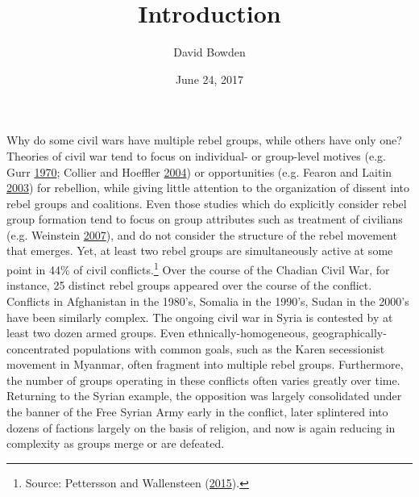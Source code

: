 \documentclass[12pt,]{book}
\title{Introduction}
\author{David Bowden}
\date{June 24, 2017}
\let\rmarkdownfootnote\footnote%
\def\footnote{\protect\rmarkdownfootnote}
\theoremstyle{definition}
\theoremstyle{definition}
\theoremstyle{remark}
\begin{document}
\maketitle

\doublespacing

\mainmatter

Why do some civil wars have multiple rebel groups, while others have
only one? Theories of civil war tend to focus on individual- or
group-level motives (e.g. Gurr \protect\hyperlink{ref-gurr70}{1970};
Collier and Hoeffler \protect\hyperlink{ref-Collier2004}{2004}) or
opportunities (e.g. Fearon and Laitin
\protect\hyperlink{ref-fearonlaitin03}{2003}) for rebellion, while
giving little attention to the organization of dissent into rebel groups
and coalitions. Even those studies which do explicitly consider rebel
group formation tend to focus on group attributes such as treatment of
civilians (e.g. Weinstein \protect\hyperlink{ref-Weinstein2007}{2007}),
and do not consider the structure of the rebel movement that emerges.
Yet, at least two rebel groups are simultaneously active at some point
in 44\% of civil conflicts.\footnote{Source: Pettersson and Wallensteen
  (\protect\hyperlink{ref-Pettersson2015a}{2015}).} Over the course of
the Chadian Civil War, for instance, 25 distinct rebel groups appeared
over the course of the conflict. Conflicts in Afghanistan in the 1980's,
Somalia in the 1990's, Sudan in the 2000's have been similarly complex.
The ongoing civil war in Syria is contested by at least two dozen armed
groups. Even ethnically-homogeneous, geographically-concentrated
populations with common goals, such as the Karen secessionist movement
in Myanmar, often fragment into multiple rebel groups. Furthermore, the
number of groups operating in these conflicts often varies greatly over
time. Returning to the Syrian example, the opposition was largely
consolidated under the banner of the Free Syrian Army early in the
conflict, later splintered into dozens of factions largely on the basis
of religion, and now is again reducing in complexity as groups merge or
are defeated.
\end{document}
